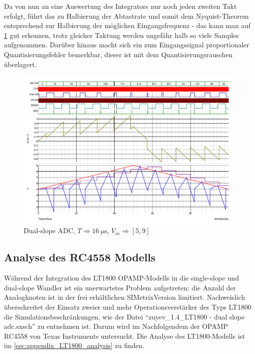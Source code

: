 \documentclass[
	ngerman,
	parskip=half,
	twocolumn,
	DIV=calc,
	]{scrartcl}
\begin{document}
		Da von nun an eine Auswertung des Integrators nur noch jeden zweiten Takt erfolgt, führt das zu Halbierung der Abtastrate und somit dem Nyquist-Theorem entsprechend zur Halbierung der möglichen Eingangsfrequenz - das kann man auf \cref{fig:dual-slope-ideal} gut erkennen, trotz gleicher Taktung werden ungefähr halb so viele Samples aufgenommen. Darüber hinaus macht sich ein zum Eingangssignal proportionaler Quantisierungsfehler bemerkbar, dieser ist mit dem Quantisierungsrauschen überlagert.
		
		\begin{figure}
			\centering
			\includegraphics[width=\linewidth]{ideal_dual_slope}
			\caption[Dual-slope ADC]{Dual-slope ADC, $T \Rightarrow \SI{16}{\micro\second}$, $V_{in} \Rightarrow [5,  9]$}
			\label{fig:dual-slope-ideal}
		\end{figure}
	
		\subsection{Analyse des RC4558 Modells}
		\label{sec:opamp_analysis}		
		
		Während der Integration des LT1800 OPAMP-Modells in die single-slope und dual-slope Wandler ist ein unerwartetes Problem aufgetreten: 
		die Anzahl der Analogknoten ist in der frei erhältlichen SIMetrix\texttrademark Version limitiert. Nachweislich überschreitet der Einsatz zweier und mehr Operationsverstärker des Typs LT1800  die Simulationsbeschränkungen, wie der Datei \enquote{zuyev\_1.4\_LT1800 - dual slope adc.sxsch} zu entnehmen ist. Darum wird im Nachfolgendem der OPAMP RC4558 von Texas Instruments untersucht. Die Analyse des LT1800-Modells ist im \cref{sec:appendix_LT1800_analysis} zu finden.		
	
\end{document}
